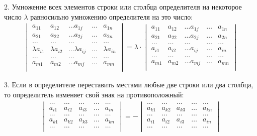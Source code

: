 \documentclass[a4paper,12pt]{extbook}
\theoremstyle{numbered}
\theoremstyle{named}
\theoremstyle{named}
\theoremstyle{named}
\begin{document}
2. Умножение всех элементов строки или столбца определителя на некоторое число \(\lambda\) равносильно умножению определителя на это число:
\begin{gather*}
    \begin{vmatrix}
        a_{11}         & a_{12}         & \dots a_{1j}         & \dots & a_{1n}         \\
        a_{21}         & a_{22}         & \dots a_{2j}         & \dots & a_{2n}         \\
        \dots          & \dots          & \dots                & \dots & \dots          \\
        \lambda a_{i1} & \lambda a_{i2} & \dots \lambda a_{ij} & \dots & \lambda a_{in} \\
        \dots          & \dots          & \dots                & \dots & \dots          \\
        a_{m1}         & a_{m2}         & \dots a_{mj}         & \dots & a_{mn}         \\
    \end{vmatrix}
    =
    \lambda \cdot
    \begin{vmatrix}
        a_{11} & a_{12} & \dots a_{1j} & \dots & a_{1n} \\
        a_{21} & a_{22} & \dots a_{2j} & \dots & a_{2n} \\
        \dots  & \dots  & \dots        & \dots & \dots  \\
        a_{i1} & a_{i2} & \dots a_{ij} & \dots & a_{in} \\
        \dots  & \dots  & \dots        & \dots & \dots  \\
        a_{m1} & a_{m2} & \dots a_{mj} & \dots & a_{mn} \\
    \end{vmatrix}
\end{gather*}

3. Если в определителе переставить местами любые две строки или два столбца, то определитель изменяет свой знак на противоположный:
\begin{gather*}
    \begin{vmatrix}
        \dots  & \dots  & \dots  & \dots & \dots  \\
        a_{i1} & a_{i2} & a_{i3} & \dots & a_{in} \\
        \dots  & \dots  & \dots  & \dots & \dots  \\
        a_{k1} & a_{k2} & a_{k3} & \dots & a_{kn} \\
        \dots  & \dots  & \dots  & \dots & \dots  \\
    \end{vmatrix}
    =
    -
    \begin{vmatrix}
        \dots  & \dots  & \dots  & \dots & \dots  \\
        a_{k1} & a_{k2} & a_{k3} & \dots & a_{kn} \\
        \dots  & \dots  & \dots  & \dots & \dots  \\
        a_{i1} & a_{i2} & a_{i3} & \dots & a_{in} \\
        \dots  & \dots  & \dots  & \dots & \dots  \\
    \end{vmatrix}
\end{gather*}
\end{document}
